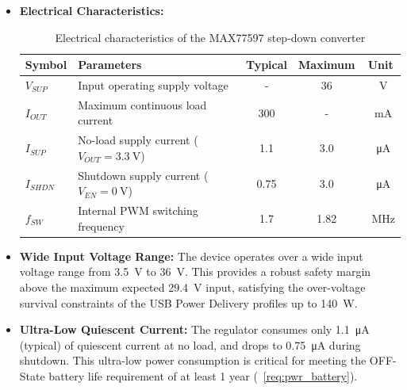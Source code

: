 \begin{itemize}

    \item \textbf{Electrical Characteristics:}

    \begin{table}[H]
        \centering
        \renewcommand{\arraystretch}{1.3}
        \caption{Electrical characteristics of the MAX77597 step-down converter}
        \label{tab:max77597_electrical}

        \begin{tabularx}{0.9\textwidth}{|l|X|c|c|c|}
            \hline
            \textbf{Symbol} &
            \textbf{Parameters} &
            \textbf{Typical} &
            \textbf{Maximum} &
            \textbf{Unit} \\
            \hline

            $V_{SUP}$ & Input operating supply voltage & - & 36 & \SI{}{\volt} \\
            \hline
            
            $I_{OUT}$ & Maximum continuous load current & 300 & - & \SI{}{\milli\ampere} \\
            \hline

            $I_{SUP}$ & No-load supply current ($V_{OUT} = \SI{3.3}{\volt}$) & 1.1 & 3.0 & \SI{}{\micro\ampere} \\
            \hline

            $I_{SHDN}$ & Shutdown supply current ($V_{EN} = \SI{0}{\volt}$) & 0.75 & 3.0 & \SI{}{\micro\ampere} \\
            \hline

            $f_{SW}$ & Internal PWM switching frequency & 1.7 & 1.82 & \SI{}{\mega\hertz} \\
            \hline

        \end{tabularx}
    \end{table}

    \item \textbf{Wide Input Voltage Range:} 
    The device operates over a wide input voltage range from \SI{3.5}{\volt} to \SI{36}{\volt}. This provides a robust safety margin above the maximum expected \SI{29.4}{\volt} input, satisfying the over-voltage survival constraints of the USB Power Delivery profiles up to \SI{140}{\watt}.

    \item \textbf{Ultra-Low Quiescent Current:} 
    The regulator consumes only \SI{1.1}{\micro\ampere} (typical) of quiescent current at no load, and drops to \SI{0.75}{\micro\ampere} during shutdown. This ultra-low power consumption is critical for meeting the OFF-State battery life requirement of at least 1 year (~\ref{req:pwr_battery}).


\end{itemize}
